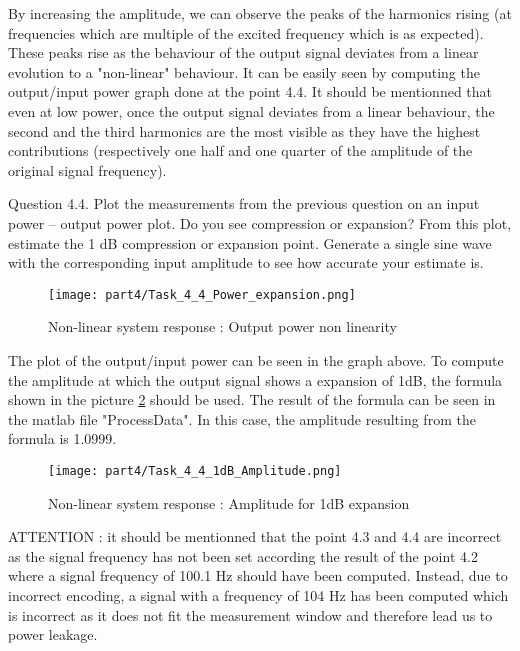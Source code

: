 By increasing the amplitude, we can observe the peaks of the harmonics rising (at frequencies which are multiple of the excited frequency which is as expected).
These peaks rise as the behaviour of the output signal deviates from a linear evolution
to a "non-linear" behaviour.  It can be easily seen by computing the output/input power graph done at the point 4.4.  It should be mentionned that even at low power,
 once the output signal deviates from a linear behaviour, the second and the third harmonics are the most visible as they have the highest contributions 
 (respectively one half and one quarter of the amplitude of the original signal frequency).

\begin{Task}{Question 4.4.}
    Plot the measurements from the previous question on an input power – output power plot. Do you see compression or expansion? From this plot, estimate the 1 dB compression or expansion point. Generate a single sine wave with the corresponding input amplitude to see how accurate your estimate is.
\end{Task}

\begin{figure}[H]
    \centering
    \texttt{[image: part4/Task\_4\_4\_Power\_expansion.png]}
    \caption{Non-linear system response : Output power non linearity}
    \label{fig:Output_power}
\end{figure}

The plot of the output/input power can be seen in the graph above.  To compute the amplitude at which the output signal shows a expansion of 1dB, the formula shown in
the picture \ref{fig:1dB_Amplitude} should be used.  The result of the formula can be seen in the matlab file "ProcessData".
In this case, the amplitude resulting from the formula is 1.0999.

\begin{figure}[H]
    \centering
    \texttt{[image: part4/Task\_4\_4\_1dB\_Amplitude.png]}
    \caption{Non-linear system response : Amplitude for 1dB expansion}
    \label{fig:1dB_Amplitude}
\end{figure}

ATTENTION : it should be mentionned that the point 4.3 and 4.4 are incorrect as the signal frequency has not been set according the result of the point 4.2 where a 
signal frequency of 100.1 Hz should have been computed.  Instead, due to incorrect encoding, a signal with a frequency of 104 Hz has been computed which is incorrect
as it does not fit the measurement window and therefore lead us to power leakage.



